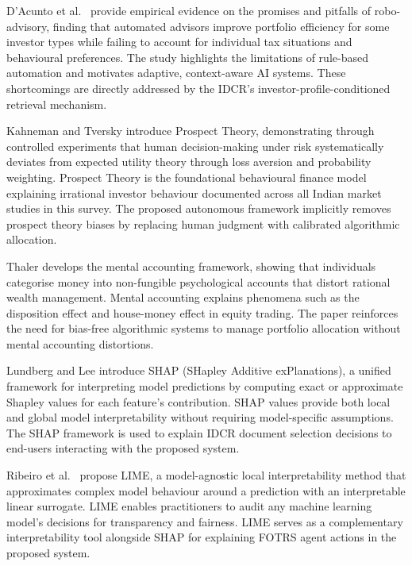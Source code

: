 \documentclass[12pt,a4paper,oneside]{report}
\theoremstyle{definition}
\theoremstyle{remark}
\begin{document}
\medskip

\noindent D'Acunto et al.\ \cite{DacuntoRoboadvisor2019} provide empirical evidence on the promises and pitfalls of robo-advisory, finding that automated advisors improve portfolio efficiency for some investor types while failing to account for individual tax situations and behavioural preferences. The study highlights the limitations of rule-based automation and motivates adaptive, context-aware AI systems. These shortcomings are directly addressed by the IDCR's investor-profile-conditioned retrieval mechanism.

\medskip

\noindent Kahneman and Tversky \cite{Kahneman1979ProspectTheory} introduce Prospect Theory, demonstrating through controlled experiments that human decision-making under risk systematically deviates from expected utility theory through loss aversion and probability weighting. Prospect Theory is the foundational behavioural finance model explaining irrational investor behaviour documented across all Indian market studies in this survey. The proposed autonomous framework implicitly removes prospect theory biases by replacing human judgment with calibrated algorithmic allocation.

\medskip

\noindent Thaler \cite{Thaler1985MentalAccounting} develops the mental accounting framework, showing that individuals categorise money into non-fungible psychological accounts that distort rational wealth management. Mental accounting explains phenomena such as the disposition effect and house-money effect in equity trading. The paper reinforces the need for bias-free algorithmic systems to manage portfolio allocation without mental accounting distortions.

\medskip

\noindent Lundberg and Lee \cite{Lundberg2017SHAP} introduce SHAP (SHapley Additive exPlanations), a unified framework for interpreting model predictions by computing exact or approximate Shapley values for each feature's contribution. SHAP values provide both local and global model interpretability without requiring model-specific assumptions. The SHAP framework is used to explain IDCR document selection decisions to end-users interacting with the proposed system.

\medskip

\noindent Ribeiro et al.\ \cite{Ribeiro2016LIME} propose LIME, a model-agnostic local interpretability method that approximates complex model behaviour around a prediction with an interpretable linear surrogate. LIME enables practitioners to audit any machine learning model's decisions for transparency and fairness. LIME serves as a complementary interpretability tool alongside SHAP for explaining FOTRS agent actions in the proposed system.
\end{document}
